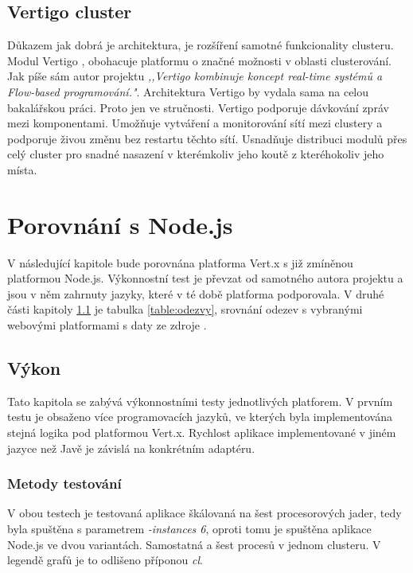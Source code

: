 \subsection{Vertigo cluster}

Důkazem jak dobrá je architektura, je rozšíření samotné funkcionality clusteru. Modul Vertigo \cite{vertigo}, obohacuje platformu o značné možnosti v oblasti clusterování. Jak píše sám autor projektu \emph{,,Vertigo kombinuje koncept real-time systémů a Flow-based programování."}. Architektura Vertigo by vydala sama na celou bakalářskou práci. Proto jen ve stručnosti. Vertigo podporuje dávkování zpráv mezi komponentami. Umožňuje vytváření a monitorování sítí mezi clustery a podporuje živou změnu bez restartu těchto sítí. Usnadňuje distribuci modulů přes celý cluster pro snadné nasazení v kterémkoliv jeho koutě z kteréhokoliv jeho místa.

\section{Porovnání s Node.js}

V následující kapitole bude porovnána platforma Vert.x s již zmíněnou platformou Node.js. Výkonnostní test \cite{benchmarkTim} je převzat od samotného autora projektu a jsou v něm zahrnuty jazyky, které v té době platforma podporovala. V druhé části kapitoly \ref{sub:performence} je tabulka \ref{table:odezvy}, srovnání odezev s vybranými webovými platformami s daty ze zdroje \cite{benchmark}.

\subsection{Výkon}\label{sub:performence}

Tato kapitola se zabývá výkonnostními testy jednotlivých platforem. V prvním testu je obsaženo více programovacích jazyků, ve kterých byla implementována stejná logika pod platformou Vert.x. Rychlost aplikace implementované v jiném jazyce než Javě je závislá na konkrétním adaptéru.

\subsubsection{Metody testování}

V obou testech je testovaná aplikace škálovaná na šest procesorových jader, tedy byla spuštěna s parametrem \emph{-instances 6}, oproti tomu je spuštěna aplikace Node.js ve dvou variantách. Samostatná a šest procesů v jednom clusteru. V legendě grafů je to odlišeno příponou \emph{cl}.


